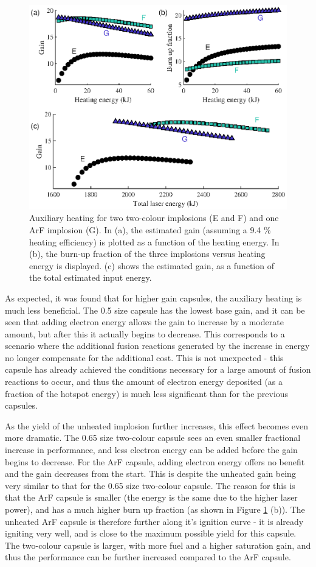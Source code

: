 \begin{figure}[ht]
\centering
\includegraphics{figures/FurtherSims/TwoColourAux.eps}
\caption{Auxiliary heating for two two-colour implosions (E and F) and one ArF implosion (G). In (a), the estimated gain (assuming a 9.4 \% heating efficiency) is plotted as a function of the heating energy. In (b), the burn-up fraction of the three implosions versus heating energy is displayed. (c) shows the estimated gain, as a function of the total estimated input energy.}
\label{fig:TwoColourAux}
\end{figure}

As expected, it was found that for higher gain capsules, the auxiliary heating is much less beneficial. The 0.5 size capsule has the lowest base gain, and it can be seen that adding electron energy allows the gain to increase by a moderate amount, but after this it actually begins to decrease. This corresponds to a scenario where the additional fusion reactions generated by the increase in energy no longer compensate for the additional cost. This is not unexpected - this capsule has already achieved the conditions necessary for a large amount of fusion reactions to occur, and thus the amount of electron energy deposited (as a fraction of the hotspot energy) is much less significant than for the previous capsules.

As the yield of the unheated implosion further increases, this effect becomes even more dramatic. The 0.65 size two-colour capsule sees an even smaller fractional increase in performance, and less electron energy can be added before the gain begins to decrease. For the ArF capsule, adding electron energy offers no benefit and the gain decreases from the start. This is despite the unheated gain being very similar to that for the 0.65 size two-colour capsule. The reason for this is that the ArF capsule is smaller (the energy is the same due to the higher laser power), and has a much higher burn up fraction (as shown in Figure \ref{fig:TwoColourAux} (b)). The unheated ArF capsule is therefore further along it's ignition curve - it is already igniting very well, and is close to the maximum possible yield for this capsule. The two-colour capsule is larger, with more fuel and a higher saturation gain, and thus the performance can be further increased compared to the ArF capsule.

